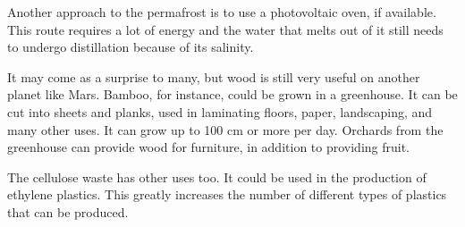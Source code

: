 Another approach to the permafrost is to use a photovoltaic oven, if available. This route requires a lot of energy and the water that melts out of it still needs to undergo distillation because of its salinity.

It may come as a surprise to many, but wood is still very useful on another planet like Mars. Bamboo, for instance, could be grown in a greenhouse. It can be cut into sheets and planks, used in laminating floors, paper, landscaping, and many other uses. It can grow up to 100 cm or more per day. Orchards from the greenhouse can provide wood for furniture, in addition to providing fruit. 

The cellulose waste has other uses too. It could be used in the production of ethylene plastics. This greatly increases the number of different types of plastics that can be produced.

